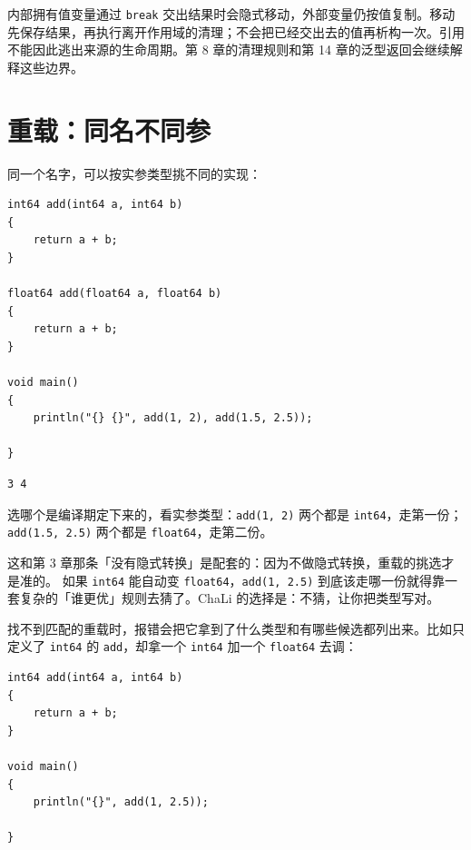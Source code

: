 内部拥有值变量通过 \texttt{break} 交出结果时会隐式移动，外部变量仍按值复制。移动先保存结果，再执行离开作用域的清理；不会把已经交出去的值再析构一次。引用不能因此逃出来源的生命周期。第 8 章的清理规则和第 14 章的泛型返回会继续解释这些边界。

\section{重载：同名不同参}

同一个名字，可以按实参类型挑不同的实现：

\par
\medskip
\begin{lstlisting}[style=chali]
int64 add(int64 a, int64 b)
{
    return a + b;
}

float64 add(float64 a, float64 b)
{
    return a + b;
}

void main()
{
    println("{} {}", add(1, 2), add(1.5, 2.5));

}
\end{lstlisting}
\par
\medskip

\par
\medskip
\begin{lstlisting}[style=out]
3 4
\end{lstlisting}
\par
\medskip

选哪个是编译期定下来的，看实参类型：\texttt{add(\allowbreak{}1,\allowbreak{} 2)\allowbreak{}} 两个都是 \texttt{int64}，走第一份；\texttt{add(\allowbreak{}1.\allowbreak{}5,\allowbreak{} 2.\allowbreak{}5)\allowbreak{}} 两个都是 \texttt{float64}，走第二份。

这和第 3 章那条「没有隐式转换」是配套的：因为不做隐式转换，重载的挑选才是准的。 如果 \texttt{int64} 能自动变 \texttt{float64}，\texttt{add(\allowbreak{}1,\allowbreak{} 2.\allowbreak{}5)\allowbreak{}} 到底该走哪一份就得靠一套复杂的「谁更优」规则去猜了。ChaLi 的选择是：不猜，让你把类型写对。

找不到匹配的重载时，报错会把它拿到了什么类型和有哪些候选都列出来。比如只定义了 \texttt{int64} 的 \texttt{add}，却拿一个 \texttt{int64} 加一个 \texttt{float64} 去调：

\par
\medskip
\begin{lstlisting}[style=chali]
int64 add(int64 a, int64 b)
{
    return a + b;
}

void main()
{
    println("{}", add(1, 2.5));

}
\end{lstlisting}
\par
\medskip

